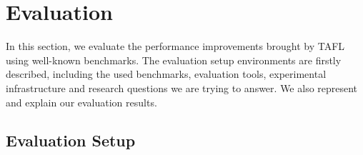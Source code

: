 \section{Evaluation}\label{experiment}

In this section, we evaluate the performance improvements brought by TAFL using well-known benchmarks. The evaluation setup environments are firstly described, including the used benchmarks, evaluation tools, experimental infrastructure and research questions we are trying to answer. We also represent and explain our evaluation results.

\subsection{Evaluation Setup}

\begin{table}[t]
\centering
\begin{adjustbox}{max width=\textwidth}


\end{adjustbox}
\end{table}
